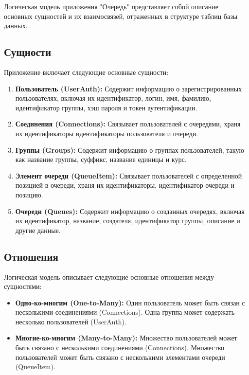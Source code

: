 Логическая модель приложения "Очередь" представляет собой описание основных
сущностей и их взаимосвязей, отраженных в структуре таблиц базы данных.

\subsection{Сущности}

Приложение включает следующие основные сущности:

\begin{enumerate}
    \item \textbf{Пользователь (UserAuth):} Содержит информацию
		о зарегистрированных пользователях, включая их идентификатор,
		логин, имя, фамилию, идентификатор группы,
		хэш пароля и токен аутентификации.
    \item \textbf{Соединения (Connections):} Связывает пользователей
		с очередями, храня их идентификаторы идентификаторы пользователя
		и очереди.
    \item \textbf{Группы (Groups):} Содержит информацию
		о группах пользователей, такую как название группы, суффикс,
		название единицы и курс.
    \item \textbf{Элемент очереди (QueueItem):} Связывает пользователей
		с определенной позицией в очереди, храня их идентификаторы,
		идентификатор очереди и позицию.
    \item \textbf{Очереди (Queues):} Содержит информацию о созданных очередях,
		включая их идентификатор, название, создателя, идентификатор группы,
		описание и другие данные.
\end{enumerate}

\subsection{Отношения}

Логическая модель описывает следующие основные отношения между сущностями:

\begin{itemize}
    \item \textbf{Одно-ко-многим (One-to-Many):}
		Один пользователь может быть связан
		с несколькими соединениями (Connections).
		Одна группа может содержать несколько пользователей (UserAuth).
    \item \textbf{Многие-ко-многим (Many-to-Many):}
		Множество пользователей может быть связано
		с несколькими соединениями (Connections).
		Множество пользователей может быть связано
		с несколькими элементами очереди (QueueItem).
\end{itemize}

